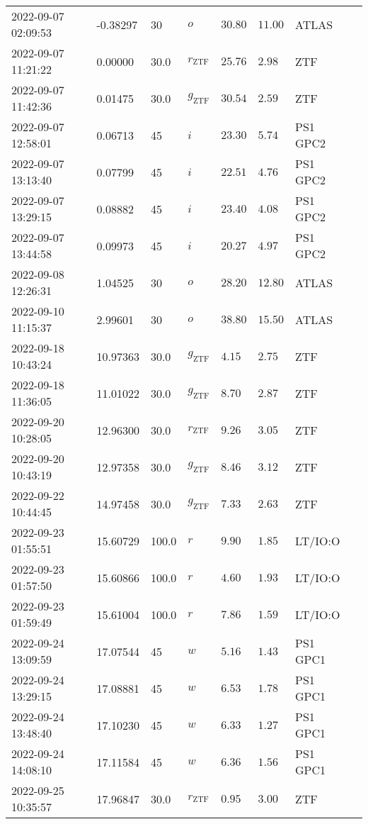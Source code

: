 \documentclass{nature_plusfigure}
\begin{document}
\begin{supplement}
\begin{center}
\begin{longtable}{llllllll}
2022-09-07 02:09:53 & -0.38297 & 30 & $o$ & $30.80$ & $11.00$ & ATLAS &  \\ 
2022-09-07 11:21:22 & 0.00000 & 30.0 & ${r}_\mathrm{ZTF}$ & $25.76$ & $2.98$ & ZTF &  \\ 
2022-09-07 11:42:36 & 0.01475 & 30.0 & ${g}_\mathrm{ZTF}$ & $30.54$ & $2.59$ & ZTF &  \\ 
2022-09-07 12:58:01 & 0.06713 & 45 & $i$ & $23.30$ & $5.74$ & PS1 GPC2 &  \\ 
2022-09-07 13:13:40 & 0.07799 & 45 & $i$ & $22.51$ & $4.76$ & PS1 GPC2 &  \\ 
2022-09-07 13:29:15 & 0.08882 & 45 & $i$ & $23.40$ & $4.08$ & PS1 GPC2 &  \\ 
2022-09-07 13:44:58 & 0.09973 & 45 & $i$ & $20.27$ & $4.97$ & PS1 GPC2 &  \\ 
2022-09-08 12:26:31 & 1.04525 & 30 & $o$ & $28.20$ & $12.80$ & ATLAS &  \\ 
2022-09-10 11:15:37 & 2.99601 & 30 & $o$ & $38.80$ & $15.50$ & ATLAS &  \\ 
2022-09-18 10:43:24 & 10.97363 & 30.0 & ${g}_\mathrm{ZTF}$ & $4.15$ & $2.75$ & ZTF &  \\ 
2022-09-18 11:36:05 & 11.01022 & 30.0 & ${g}_\mathrm{ZTF}$ & $8.70$ & $2.87$ & ZTF &  \\ 
2022-09-20 10:28:05 & 12.96300 & 30.0 & ${r}_\mathrm{ZTF}$ & $9.26$ & $3.05$ & ZTF &  \\ 
2022-09-20 10:43:19 & 12.97358 & 30.0 & ${g}_\mathrm{ZTF}$ & $8.46$ & $3.12$ & ZTF &  \\ 
2022-09-22 10:44:45 & 14.97458 & 30.0 & ${g}_\mathrm{ZTF}$ & $7.33$ & $2.63$ & ZTF &  \\ 
2022-09-23 01:55:51 & 15.60729 & 100.0 & $r$ & $9.90$ & $1.85$ & LT/IO:O &  \\ 
2022-09-23 01:57:50 & 15.60866 & 100.0 & $r$ & $4.60$ & $1.93$ & LT/IO:O &  \\ 
2022-09-23 01:59:49 & 15.61004 & 100.0 & $r$ & $7.86$ & $1.59$ & LT/IO:O &  \\ 
2022-09-24 13:09:59 & 17.07544 & 45 & $w$ & $5.16$ & $1.43$ & PS1 GPC1 &  \\ 
2022-09-24 13:29:15 & 17.08881 & 45 & $w$ & $6.53$ & $1.78$ & PS1 GPC1 &  \\ 
2022-09-24 13:48:40 & 17.10230 & 45 & $w$ & $6.33$ & $1.27$ & PS1 GPC1 &  \\ 
2022-09-24 14:08:10 & 17.11584 & 45 & $w$ & $6.36$ & $1.56$ & PS1 GPC1 &  \\ 
2022-09-25 10:35:57 & 17.96847 & 30.0 & ${r}_\mathrm{ZTF}$ & $0.95$ & $3.00$ & ZTF &  \\ 

\end{longtable}
\end{center}
\end{supplement}
\end{document}

